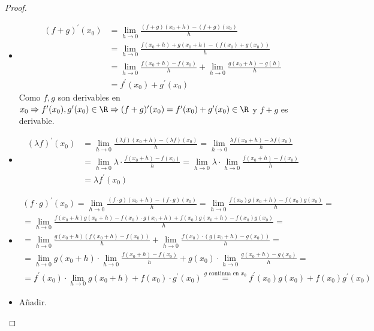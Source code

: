 \begin{proof}
	\begin{itemize}
		\item
		      \begin{align*}
			      (f + g)^\prime (x_0) & = \lim\limits_{h  \to 0 } \frac{(f + g)(x_{0} + h) - (f + g)(x_0)}{h} \\&  =  \lim\limits_{h  \to 0 } \frac{f(x_0 + h) + g(x_0 + h) - (f(x_0) + g(x_0))}{h } \\ &  = \lim\limits_{h  \to 0 } \frac{f(x_0 + h) - f(x_0)}{h} + \lim\limits_{h  \to 0 } \frac{g(x_0 + h) - g(h)}{h } \\ & = f^\prime (x_0) + g^\prime (x_0)
		      \end{align*}
		      Como \(f,g \) son derivables en \(x_0 \Rightarrow f^\prime (x_0), g^\prime (x_0) \in \R \Rightarrow (f + g)^\prime (x_0) = f^\prime (x_0) + g^\prime (x_0) \in \R \) y \(f + g \) es derivable.
		\item
		      \begin{align*}
			      (\lambda f)^\prime (x_0) & = \lim\limits_{h  \to 0 } \frac{(\lambda f)(x_0 + h) - (\lambda f)(x_0)}{h} = \lim\limits_{h  \to 0 } \frac{\lambda f(x_{0} + h ) - \lambda f(x_0)}{h} \\ & = \lim\limits_{h  \to 0 }\lambda \cdot \frac{f(x_0 + h) - f(x_0)}{h} = \lim\limits_{h  \to 0 } \lambda \cdot \lim\limits_{h  \to 0} \frac{f(x_0 + h) - f(x_0)}{h} \\ & = \lambda f^\prime (x_0)
		      \end{align*}
		\item \begin{multline*}
			      (f \cdot g)^\prime (x_0) = \lim\limits_{h  \to 0 } \frac{(f \cdot g)(x_0 + h) - (f \cdot g)(x_0)}{h} = \lim\limits_{h  \to 0 } \frac{f(x_0)g(x_0 + h) - f(x_0)g(x_0)}{h} = \\ = \lim\limits_{h  \to 0 } \frac{f(x_0 + h)g(x_0 + h) - f(x_0) \cdot g(x_0 + h) + f(x_0)g(x_0 + h) - f(x_0)g(x_0)}{h} = \\ = \lim\limits_{h  \to 0 } \frac{g(x_0 + h) (f(x_0 + h) - f(x_0))}{h} + \lim\limits_{h  \to 0 } \frac{f(x_0) \cdot (g(x_0 + h) - g(x_0))}{h} = \\ =  \lim\limits_{h  \to 0 } g(x_0 + h) \cdot \lim\limits_{h   \to 0 } \frac{f(x_0 + h) - f(x_0)}{h} + g(x_0) \cdot \lim\limits_{h  \to 0 } \frac{g(x_0 + h) - g(x_0)}{h } = \\ = f^\prime(x_0) \cdot \lim\limits_{h  \to 0 } g(x_0 + h ) + f(x_0) \cdot g^\prime (x_0) \overset{g\text{ continua en } x_0 }{= } f^\prime (x_0) g(x_0) + f(x_0) g^\prime (x_0)
		      \end{multline*}
		\item Añadir.
	\end{itemize}
\end{proof}
